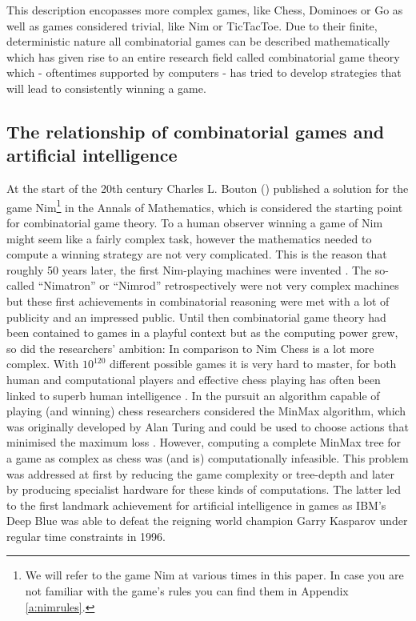 \documentclass[12pt,a4paper]{article}
\begin{document}
This description encopasses more complex games, like Chess, Dominoes or Go as well as games considered trivial, like Nim or TicTacToe. Due to their finite, deterministic nature all combinatorial games can be described mathematically which has given rise to an entire research field called combinatorial game theory which - oftentimes supported by computers -  has tried to develop strategies that will lead to consistently winning a game.

\subsection{The relationship of combinatorial games and artificial intelligence}
At the start of the 20th century Charles L. Bouton (\citeyear{bouton_nim_1901}) published a solution for the game Nim\footnote{We will refer to the game Nim at various times in this paper. In case you are not familiar with the game’s rules you can find them in Appendix \ref{a:nimrules}.} in the Annals of Mathematics, which is considered the starting point for combinatorial game theory. To a human observer winning a game of Nim might seem like a fairly complex task, however the mathematics needed to compute a winning strategy are not very complicated. This is the reason that roughly 50 years later, the first Nim-playing machines were invented \citep{pisano_combinatorial_2015}. The so-called “Nimatron” or “Nimrod” retrospectively were not very complex machines but these first achievements in combinatorial reasoning were met with a lot of publicity and an impressed public. Until then combinatorial game theory had been contained to games in a playful context but as the computing power grew, so did the researchers’ ambition: In comparison to Nim Chess is a lot more complex. With $10^{120}$ different possible games it is very hard to master, for both human and computational players and effective chess playing has often been linked to superb human intelligence \citep{schockaert_combinatorial_2016}. In the pursuit an algorithm capable of playing (and winning) chess researchers considered the MinMax algorithm, which was originally developed by Alan Turing and could be used to choose actions that minimised the maximum loss \citep{pisano_combinatorial_2015}. However, computing a complete MinMax tree for a game as complex as chess was (and is) computationally infeasible. This problem was addressed at first by reducing the game complexity or tree-depth and later by producing specialist hardware for these kinds of computations. The latter led to the first landmark achievement for artificial intelligence in games as IBM’s Deep Blue was able to defeat the reigning world champion Garry Kasparov under regular time constraints in 1996. 
\end{document}

